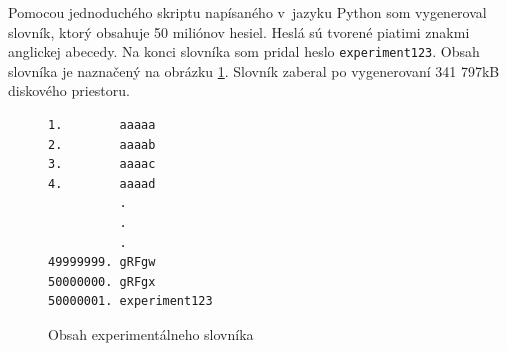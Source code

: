 \documentclass[zadani,slovak]{fitthesis}
\begin{document}
Pomocou jednoduchého skriptu napísaného v~jazyku Python som vygeneroval slovník, ktorý obsahuje 50 miliónov hesiel. Heslá sú tvorené piatimi znakmi anglickej abecedy. Na konci slovníka som pridal heslo \texttt{experiment123}. Obsah slovníka je naznačený na obrázku \ref{fig:experimentDict}. Slovník zaberal po vygenerovaní 341 797kB diskového priestoru.
\begin{figure}[h]
\begin{center}
\begin{varwidth}{\linewidth}
\begin{verbatim}
1.        aaaaa
2.        aaaab
3.        aaaac
4.        aaaad
          .
          .
          .
49999999. gRFgw
50000000. gRFgx
50000001. experiment123
\end{verbatim}
\end{varwidth}
\end{center}
\caption{Obsah experimentálneho slovníka}
\label{fig:experimentDict}
\end{figure}
\end{document}
